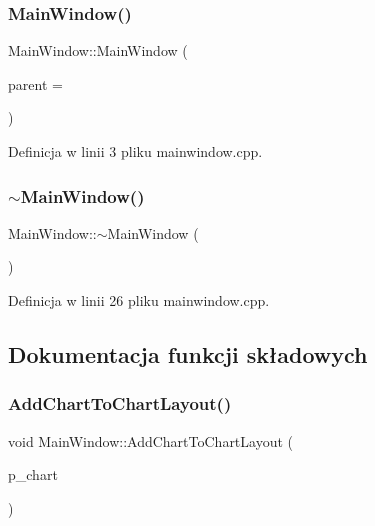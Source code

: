 \subsubsection{\texorpdfstring{Main\+Window()}{MainWindow()}}
{\footnotesize\ttfamily Main\+Window\+::\+Main\+Window (\begin{DoxyParamCaption}\item[{Q\+Widget $\ast$}]{parent = {} }\end{DoxyParamCaption})\hspace{0.3cm}{\ttfamily [explicit]}}



Definicja w linii 3 pliku mainwindow.\+cpp.

\mbox{\label{class_main_window_ae98d00a93bc118200eeef9f9bba1dba7}} 
\subsubsection{\texorpdfstring{$\sim$\+Main\+Window()}{~MainWindow()}}
{\footnotesize\ttfamily Main\+Window\+::$\sim$\+Main\+Window (\begin{DoxyParamCaption}{ }\end{DoxyParamCaption})}



Definicja w linii 26 pliku mainwindow.\+cpp.



\subsection{Dokumentacja funkcji składowych}
\mbox{\label{class_main_window_a28c931197fe41747312d4634b39ea786}} 
\subsubsection{\texorpdfstring{Add\+Chart\+To\+Chart\+Layout()}{AddChartToChartLayout()}}
{\footnotesize\ttfamily void Main\+Window\+::\+Add\+Chart\+To\+Chart\+Layout (\begin{DoxyParamCaption}\item[{Q\+Chart $\ast$}]{p\+\_\+chart }\end{DoxyParamCaption})}


